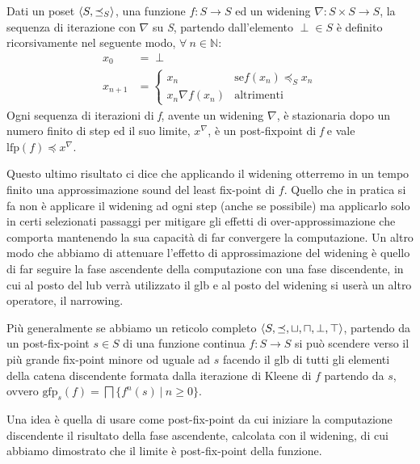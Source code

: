 \begin{definition}
Dati un poset \(\langle S, \preceq_{S}\rangle\), una funzione \(f:S\rightarrow S\) ed un widening \(\nabla : S\times S\rightarrow S\), la sequenza di iterazione con \(\nabla\) su \textit{S}, partendo dall'elemento \(\perp\in S\) è definito ricorsivamente nel seguente modo, \(\forall \ n \in \mathbb{N}\):
\begin{align*}
x_0 &= \perp \\
x_{n+1} &=  \begin{cases}
            x_n &\textrm{se} f(x_n)\preceq_S x_n \\
            x_n \nabla f(x_n) &\textrm{altrimenti}
            \end{cases}
\end{align*}
Ogni sequenza di iterazioni di \textit{f}, avente un widening \(\nabla\), è stazionaria dopo un numero finito di step ed il suo limite, \(x^{\nabla}\), è un post-fixpoint di \textit{f} e vale \(\textrm{lfp}(f)\preceq x^{\nabla}\). 
\end{definition}

Questo ultimo risultato ci dice che applicando il widening otterremo in un tempo finito una approssimazione sound del least fix-point di \(f\). Quello che in pratica si fa non è applicare il widening ad ogni step (anche se possibile) ma applicarlo solo in certi selezionati passaggi per mitigare gli effetti di over-approssimazione che comporta mantenendo la sua capacità di far convergere la computazione. Un altro modo che abbiamo di attenuare l'effetto di approssimazione del widening è quello di far seguire la fase ascendente della computazione con una fase discendente, in cui al posto del lub verrà utilizzato il glb e al posto del widening si userà un altro operatore, il narrowing.

Più generalmente se abbiamo un reticolo completo \(\langle S, \preceq,\sqcup, \sqcap, \perp, \top\rangle\), partendo da un post-fix-point \(s\in S\) di una funzione continua \(f:S\rightarrow S\) si può scendere verso il più grande fix-point minore od uguale ad \(s\) facendo il glb di tutti gli elementi della catena discendente formata dalla iterazione di Kleene di \(f\) partendo da \(s\), ovvero \(\textrm{gfp}_s(f)=\bigsqcap\{f^n(s)\ |\ n\geq 0\}\). 

Una idea è quella di usare come post-fix-point da cui iniziare la computazione discendente il risultato della fase ascendente, calcolata con il widening, di cui abbiamo dimostrato che il limite è post-fix-point della funzione.

